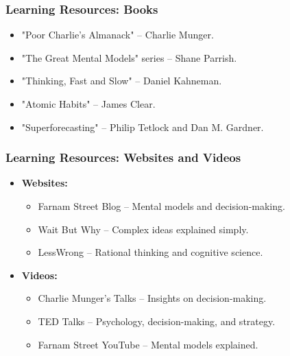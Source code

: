 \begin{frame}[fragile]\frametitle{Learning Resources: Books}
    \begin{itemize}
        \item "Poor Charlie's Almanack" – Charlie Munger.
        \item "The Great Mental Models" series – Shane Parrish.
        \item "Thinking, Fast and Slow" – Daniel Kahneman.
        \item "Atomic Habits" – James Clear.
        \item "Superforecasting" – Philip Tetlock and Dan M. Gardner.
    \end{itemize}
\end{frame}

\begin{frame}[fragile]\frametitle{Learning Resources: Websites and Videos}
    \begin{itemize}
        \item \textbf{Websites:}
        \begin{itemize}
            \item Farnam Street Blog – Mental models and decision-making.
            \item Wait But Why – Complex ideas explained simply.
            \item LessWrong – Rational thinking and cognitive science.
        \end{itemize}
        \item \textbf{Videos:}
        \begin{itemize}
            \item Charlie Munger’s Talks – Insights on decision-making.
            \item TED Talks – Psychology, decision-making, and strategy.
            \item Farnam Street YouTube – Mental models explained.
        \end{itemize}
    \end{itemize}
\end{frame}
